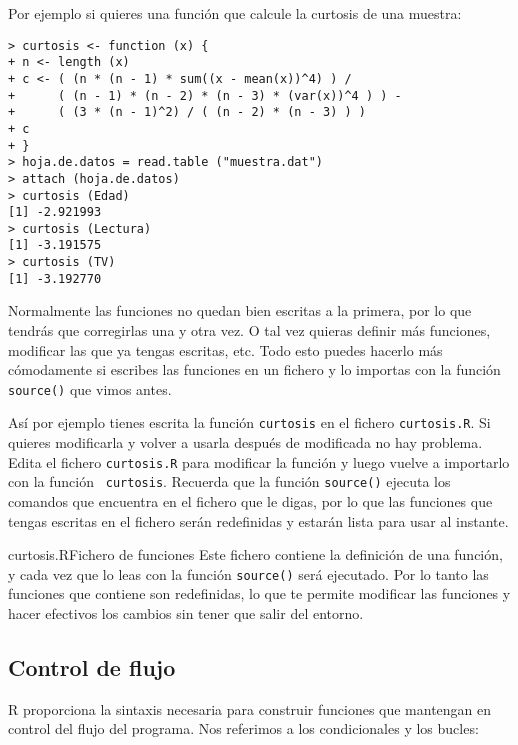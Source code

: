Por ejemplo  si quieres  una función  que calcule  la curtosis  de una
muestra:

\begin{verbatim}
> curtosis <- function (x) {
+ n <- length (x)
+ c <- ( (n * (n - 1) * sum((x - mean(x))^4) ) /
+      ( (n - 1) * (n - 2) * (n - 3) * (var(x))^4 ) ) -
+      ( (3 * (n - 1)^2) / ( (n - 2) * (n - 3) ) )
+ c 
+ }
> hoja.de.datos = read.table ("muestra.dat")
> attach (hoja.de.datos)
> curtosis (Edad)
[1] -2.921993
> curtosis (Lectura)
[1] -3.191575
> curtosis (TV)
[1] -3.192770
\end{verbatim}

Normalmente las funciones no quedan bien escritas a la primera, por lo
que tendrás que corregirlas una y  otra vez. O tal vez quieras definir
más funciones,  modificar las que  ya tengas escritas, etc.  Todo esto
puedes hacerlo más cómodamente si escribes las funciones en un fichero
y lo importas con la función {\tt source()} que vimos antes.


Así por ejemplo tienes escrita la función {\tt curtosis} en el fichero
{\tt curtosis.R}. Si quieres modificarla  y volver a usarla después de
modificada no  hay problema.  Edita el  fichero {\tt  curtosis.R} para
modificar la función  y luego vuelve a importarlo con  la función {\tt
curtosis}. Recuerda que la función {\tt source()} ejecuta los comandos
que encuentra en el fichero que le digas, por lo que las funciones que
tengas escritas en  el fichero serán redefinidas y  estarán lista para
usar al instante.

\begin{ejemplo}{curtosis.R}{Fichero de funciones}
Este fichero contiene la definición de  una función, y cada vez que lo
leas con  la función {\tt source()}  será ejecutado. Por lo  tanto las
funciones que  contiene son redefinidas,  lo que te  permite modificar
las funciones  y hacer efectivos los  cambios sin tener que  salir del
entorno.
\end{ejemplo}

\subsection{Control de flujo}


{\sf R} proporciona la sintaxis necesaria para construir funciones que
mantengan  en control  del flujo  del  programa. Nos  referimos a  los
condicionales y los bucles:

